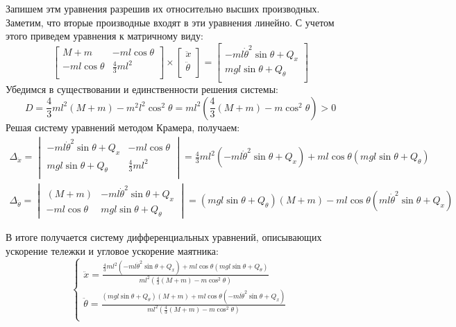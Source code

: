 Запишем этм уравнения разрешив их относительно высших производных. Заметим, что вторые производные 
входят в эти уравнения линейно. С учетом этого приведем уравнения к матричному виду: 
\begin{equation}
    \begin{bmatrix}
        M + m &  -ml\cos\theta \\
        -ml\cos\theta & \frac{4}{3}ml^2 \\ 
    \end{bmatrix} \times
    \begin{bmatrix}
        \ddot{x} \\
        \ddot{\theta} \\
    \end{bmatrix} =
    \begin{bmatrix}
        -ml\dot{\theta}^2\sin\theta + Q_x \\ 
        mgl\sin\theta + Q_{\theta} \\
    \end{bmatrix}
\end{equation}
Убедимся в существовании и единственности решения системы:
\begin{equation}
    D = \frac{4}{3}ml^2(M + m) - m^2l^2\cos^2\theta = ml^2\left(\frac{4}{3}(M + m) - m\cos^2\theta\right) > 0
\end{equation}
Решая систему уравнений методом Крамера, получаем:
\begin{multline}
    \Delta_{\ddot{x}} = \begin{vmatrix}
        -ml\dot{\theta}^2\sin\theta + Q_x & -ml\cos\theta \\
        mgl\sin\theta + Q_{\theta} & \frac{4}{3}ml^2 \\
    \end{vmatrix} = \frac{4}{3}ml^2(-ml\dot{\theta}^2\sin\theta + Q_x) + ml\cos\theta(mgl\sin\theta + Q_{\theta}) 
\end{multline}
\begin{multline}
    \Delta_{\ddot{\theta}} = \begin{vmatrix}
        (M + m) & -ml\dot{\theta}^2\sin\theta + Q_x \\ 
        -ml\cos\theta & mgl\sin\theta + Q_{\theta} 
    \end{vmatrix} = (mgl\sin\theta + Q_{\theta})(M + m) - ml\cos\theta(ml\dot{\theta}^2\sin\theta + Q_x) 
\end{multline}

В итоге получается систему дифференциальных уравнений, описывающих ускорение тележки и угловое ускорение маятника:
\begin{equation}
    \begin{cases}
        \ddot{x} = \frac{\frac{4}{3}ml^2(-ml\dot{\theta}^2\sin\theta + Q_x) + ml\cos\theta(mgl\sin\theta + Q_{\theta}) }{ml^2(\frac{4}{3}(M + m) - m\cos^2\theta)} \\ 
        \ddot{\theta} = \frac{(mgl\sin\theta + Q_{\theta})(M + m) + ml\cos\theta(-ml\dot{\theta}^2\sin\theta + Q_x) }{ml^2(\frac{4}{3}(M + m) - m\cos^2\theta)} \\ 
    \end{cases}
    \label{eq:nonlinear_model}
\end{equation}

